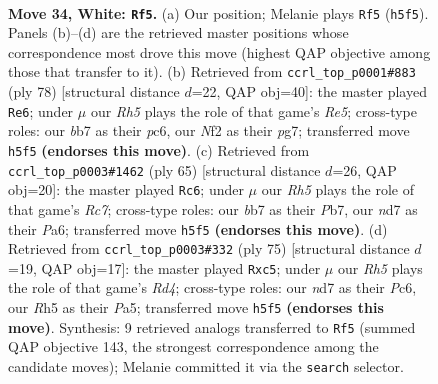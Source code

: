 \documentclass[11pt]{article}
\begin{document}
\clearpage

\begin{figure}[p]\centering
\begin{subfigure}{0.46\textwidth}\centering
\resizebox{\linewidth}{!}{%
\newchessgame
\chessboard[
  setfen={7r/1b1n2k1/8/3p3R/p7/P5P1/1PP2N2/2K5 w - - 2 34},
  showmover=false,
  pgfstyle=straightmove, color=movearrow, markmove={h5-f5}
]}
\caption{}
\end{subfigure}\hfill
\begin{subfigure}{0.46\textwidth}\centering
\resizebox{\linewidth}{!}{%
\newchessgame
\chessboard[
  setfen={6k1/6p1/2p5/1r2R2p/7P/6P1/5PK1/8 w - - 2 40},
  showmover=false,
  pgfstyle=straightmove, color=movearrow, markmove={e5-e6}
]}
\caption{}
\end{subfigure}
\\[4pt]
\begin{subfigure}{0.46\textwidth}\centering
\resizebox{\linewidth}{!}{%
\newchessgame
\chessboard[
  setfen={8/1p3p2/p5kp/8/8/1P2P3/1PrR2PP/4K3 b - - 2 33},
  showmover=false,
  pgfstyle=straightmove, color=movearrow, markmove={c2-c6}
]}
\caption{}
\end{subfigure}\hfill
\begin{subfigure}{0.46\textwidth}\centering
\resizebox{\linewidth}{!}{%
\newchessgame
\chessboard[
  setfen={5k2/5pp1/2p5/p1Pr1P2/R7/1p5P/4K3/1B6 b - - 3 38},
  showmover=false,
  pgfstyle=straightmove, color=movearrow, markmove={d5-c5}
]}
\caption{}
\end{subfigure}
\caption{\textbf{Move 34, White: \texttt{Rf5}.} (a) Our position; Melanie plays \texttt{Rf5} (\texttt{h5f5}). Panels (b)--(d) are the retrieved master positions whose correspondence most drove this move (highest QAP objective among those that transfer to it). (b) Retrieved from \texttt{ccrl\_top\_p0001\#883} (ply 78) [structural distance $d$=22, QAP obj=40]: the master played \texttt{Re6}; under $\mu$ our \emph{Rh5} plays the role of that game's \emph{Re5}; cross-type roles: our \emph{b}b7 as their \emph{p}c6, our \emph{N}f2 as their \emph{p}g7; transferred move \texttt{h5f5} \textbf{(endorses this move)}. (c) Retrieved from \texttt{ccrl\_top\_p0003\#1462} (ply 65) [structural distance $d$=26, QAP obj=20]: the master played \texttt{Rc6}; under $\mu$ our \emph{Rh5} plays the role of that game's \emph{Rc7}; cross-type roles: our \emph{b}b7 as their \emph{P}b7, our \emph{n}d7 as their \emph{P}a6; transferred move \texttt{h5f5} \textbf{(endorses this move)}. (d) Retrieved from \texttt{ccrl\_top\_p0003\#332} (ply 75) [structural distance $d$=19, QAP obj=17]: the master played \texttt{Rxc5}; under $\mu$ our \emph{Rh5} plays the role of that game's \emph{Rd4}; cross-type roles: our \emph{n}d7 as their \emph{P}c6, our \emph{R}h5 as their \emph{P}a5; transferred move \texttt{h5f5} \textbf{(endorses this move)}. Synthesis: 9 retrieved analogs transferred to \texttt{Rf5} (summed QAP objective 143, the strongest correspondence among the candidate moves); Melanie committed it via the \texttt{search} selector.}
\label{fig:thought-m66}
\end{figure}
\end{document}
